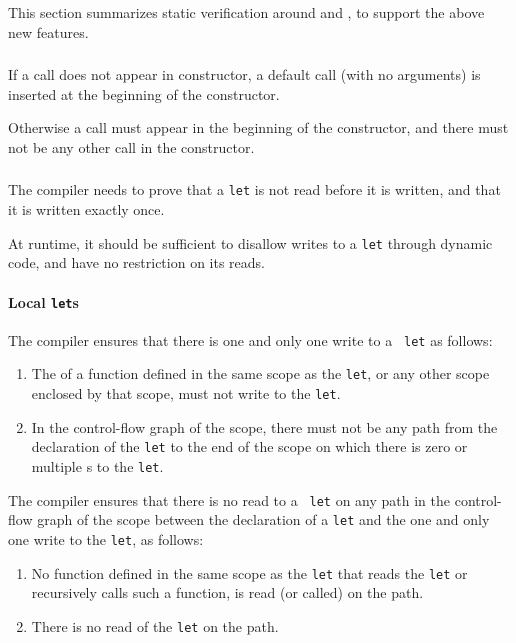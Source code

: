 This section summarizes static verification around
 and , to support the above new features.

\subsubsection{}

If a  call does not appear in constructor, a default
 call (with no arguments)
is inserted at the beginning of the constructor.

Otherwise a  call
must appear in the beginning of the constructor, and there must not be any other 
call in the constructor.

\subsubsection{}

The compiler needs to prove that a {\tt let} is not read before it is
written, and that it is written exactly once.

At runtime, it should be sufficient to disallow writes to a
{\tt let} through
 dynamic code, and have no restriction on its reads.

\paragraph{Local {\tt let}s}

The compiler ensures that there is one and only one write to a {\tt
  let} as follows:
\begin{enumerate}
\item The  of a function defined in the same
  scope as the {\tt let}, or any other scope enclosed by that scope, must not
  write to the {\tt let}.
\item In the control-flow graph of the scope, there must not be any
  path from the declaration of the {\tt let} to the end of the scope
  on which there is zero or multiple s to the {\tt let}.
\end{enumerate}

The compiler ensures that there is no read to a {\tt
  let} on any path in the control-flow graph of the scope between the
declaration of a {\tt let} and the one and only one write to the
{\tt let}, as follows:
\begin{enumerate}
\item No function defined in the same scope as the
{\tt let} that reads the {\tt let} or recursively calls such a
function, is read (or called) on the path.
\item There is no read of the {\tt let} on the path.
\end{enumerate}

